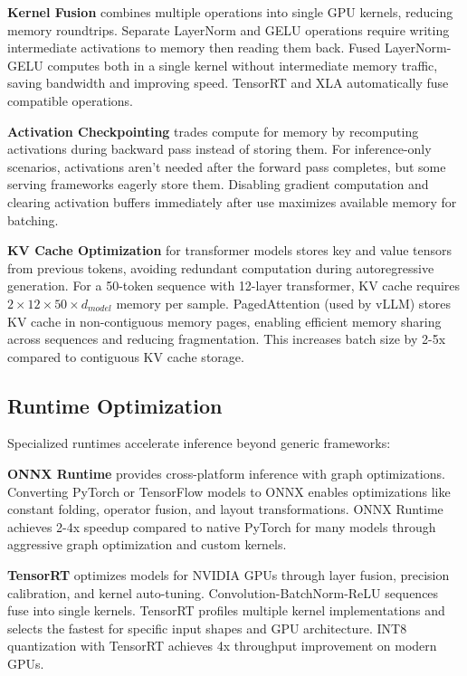 \textbf{Kernel Fusion} combines multiple operations into single GPU kernels, reducing memory roundtrips. Separate LayerNorm and GELU operations require writing intermediate activations to memory then reading them back. Fused LayerNorm-GELU computes both in a single kernel without intermediate memory traffic, saving bandwidth and improving speed. TensorRT and XLA automatically fuse compatible operations.

\textbf{Activation Checkpointing} trades compute for memory by recomputing activations during backward pass instead of storing them. For inference-only scenarios, activations aren't needed after the forward pass completes, but some serving frameworks eagerly store them. Disabling gradient computation and clearing activation buffers immediately after use maximizes available memory for batching.

\textbf{KV Cache Optimization} for transformer models stores key and value tensors from previous tokens, avoiding redundant computation during autoregressive generation. For a 50-token sequence with 12-layer transformer, KV cache requires $2 \times 12 \times 50 \times d_{model}$ memory per sample. PagedAttention (used by vLLM) stores KV cache in non-contiguous memory pages, enabling efficient memory sharing across sequences and reducing fragmentation. This increases batch size by 2-5x compared to contiguous KV cache storage.

\subsection{Runtime Optimization}

Specialized runtimes accelerate inference beyond generic frameworks:

\textbf{ONNX Runtime} provides cross-platform inference with graph optimizations. Converting PyTorch or TensorFlow models to ONNX enables optimizations like constant folding, operator fusion, and layout transformations. ONNX Runtime achieves 2-4x speedup compared to native PyTorch for many models through aggressive graph optimization and custom kernels.

\textbf{TensorRT} optimizes models for NVIDIA GPUs through layer fusion, precision calibration, and kernel auto-tuning. Convolution-BatchNorm-ReLU sequences fuse into single kernels. TensorRT profiles multiple kernel implementations and selects the fastest for specific input shapes and GPU architecture. INT8 quantization with TensorRT achieves 4x throughput improvement on modern GPUs.

